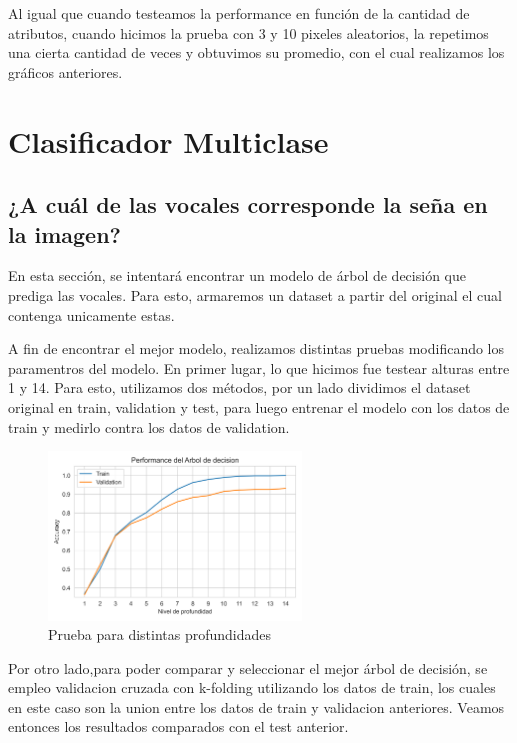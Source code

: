 \documentclass[10pt,a4paper]{article}
\begin{document}
Al igual que cuando testeamos la performance en función de la cantidad de atributos, cuando hicimos la prueba con 3 y 10 pixeles aleatorios, la repetimos una cierta cantidad de veces y obtuvimos su promedio, con el cual realizamos los gráficos anteriores.

\newpage

\section{Clasificador Multiclase}

\vspace{0.05cm}

\subsection{¿A cuál de las vocales corresponde la seña en la imagen?}

En esta sección, se intentará encontrar un modelo de árbol de decisión que prediga las vocales. Para esto, armaremos un dataset a partir del original el cual contenga unicamente estas. \vspace{0.05cm}

A fin de encontrar el mejor modelo, realizamos distintas pruebas modificando los paramentros del modelo. En primer lugar, lo que hicimos fue testear alturas
entre 1 y 14. Para esto, utilizamos dos métodos, por un lado dividimos  el dataset original en train, validation y test, para luego entrenar
el modelo con los datos de train y medirlo contra los datos de validation. 

\begin{figure}[h]
  \centering
  \includegraphics[width=0.6\textwidth]{Imagenes/primer_prueba_arbol.png}
  \caption{Prueba para distintas profundidades}
  \label{fig:Tabla 1}
\end{figure}

Por otro lado,para poder comparar y seleccionar el mejor árbol de decisión, se empleo validacion cruzada con k-folding utilizando los datos de train, los cuales
en este caso son la union entre los datos de train y validacion anteriores. Veamos entonces los resultados comparados con el test anterior.
\end{document}
